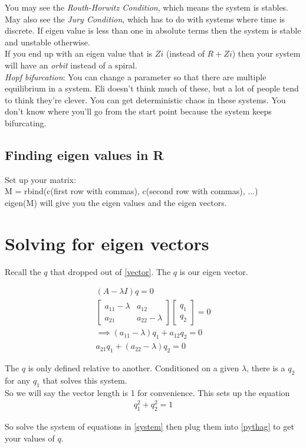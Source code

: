 \documentclass{article}
\begin{document}
You may see the \textit{Routh-Horwitz Condition}, which means the system is stables. \\

May also see the \textit{Jury Condition}, which has to do with systems where time is discrete. If eigen value is less than one in absolute terms then the system is stable and unstable otherwise. \\

If you end up with an eigen value that is $Zi$ (instead of $R + Zi$) then your system will have an \textit{orbit} instead of a spiral. \\

\textit{Hopf bifurcation}: You can change a parameter so that there are multiple equilibrium in a system. Eli doesn't think much of these, but a lot of people tend to think they're clever. You can get deterministic chaos in these systems. You don't know where you'll go from the start point because the system keeps bifurcating.  

\subsection{Finding eigen values in R}
Set up your matrix: \\
M = rbind(c(first row with commas), c(second row with commas), ...) \\
eigen(M)  will give you the eigen values and the eigen vectors. 

\section{Solving for eigen vectors}
Recall the $q$ that dropped out of \ref{vector}.  The $q$ is our eigen vector. 

\begin{align}
    (A - \lambda I ) q = 0 \\
    \begin{bmatrix}
        a_{11} - \lambda & a_{12} \\
        a_{21} & a_{22} - \lambda
    \end{bmatrix}
    \begin{bmatrix}
        q_1 \\
        q_2
    \end{bmatrix} = 0 \\
    \implies (a_{11} - \lambda) q_1 + a_{12} q_2 = 0 \label{system} \\
    a_{21} q_1 + (a_{22} - \lambda) q_2 = 0 
\end{align}

The $q$ is only defined relative to another. Conditioned on a given $\lambda$, there is a $q_2$ for any $q_1$ that solves this system. \\

So we will say the vector length is 1 for convenience. This sets up the equation 
\begin{align}
    q_1^2 + q_2^2 = 1 \label{pythag}
\end{align}

So solve the system of equations in \ref{system} then plug them into \ref{pythag} to get your values of $q$. 
\end{document}
